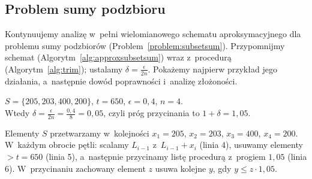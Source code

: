\subsection{Problem sumy podzbioru}

Kontynuujemy analizę w~pełni wielomianowego schematu aproksymacyjnego dla problemu sumy podzbiorów (Problem~\ref{problem:subsetsum}). Przypomnijmy schemat  (Algorytm~\ref{alg:approxsubsetsum}) wraz z~procedurą  (Algorytm~\ref{alg:trim}); ustalamy $\delta = \frac{\epsilon}{2n}$. Pokażemy najpierw przykład jego działania, a~następnie dowód poprawności i~analizę złożoności.

\begin{example}
	$S = \{205, 203, 400, 200\}$, $t = 650$, $\epsilon = 0{,}4$, $n = 4$.\\
	Wtedy $\delta = \frac{\epsilon}{2n} = \frac{0{,}4}{8} = 0{,}05$, czyli próg przycinania to $1 + \delta = 1{,}05$.

	Elementy $S$ przetwarzamy w~kolejności $x_1 = 205$, $x_2 = 203$, $x_3 = 400$, $x_4 = 200$. W~każdym obrocie pętli: scalamy $L_{i-1}$ z~$L_{i-1} + x_i$ (linia 4), usuwamy elementy $> t = 650$ (linia 5), a~następnie przycinamy listę procedurą  z~progiem $1{,}05$ (linia 6). W~przycinaniu zachowany element $z$ usuwa kolejne $y$, gdy $y \leq z \cdot 1{,}05$.


\end{example}
